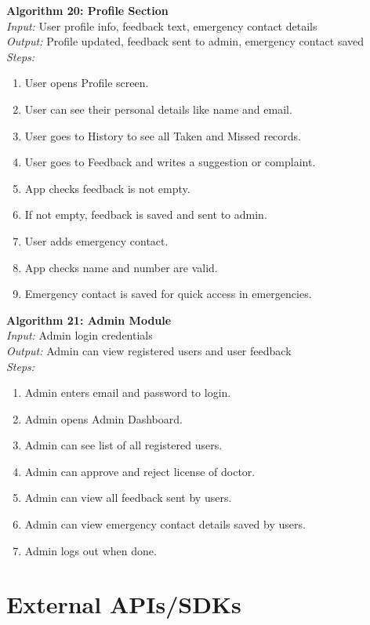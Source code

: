 \documentclass[12pt, a4paper, oneside]{report}
\begin{document}
\textbf{Algorithm 20: Profile Section}\\
\textit{Input:} User profile info, feedback text, emergency contact details\\
\textit{Output:} Profile updated, feedback sent to admin, emergency contact saved\\
\textit{Steps:}
\begin{enumerate}
    \item User opens Profile screen.
    \item User can see their personal details like name and email.
    \item User goes to History to see all Taken and Missed records.
    \item User goes to Feedback and writes a suggestion or complaint.
    \item App checks feedback is not empty.
    \item If not empty, feedback is saved and sent to admin.
    \item User adds emergency contact.
    \item App checks name and number are valid.
    \item Emergency contact is saved for quick access in emergencies.
\end{enumerate}

\textbf{Algorithm 21: Admin Module}\\
\textit{Input:} Admin login credentials\\
\textit{Output:} Admin can view registered users and user feedback\\
\textit{Steps:}
\begin{enumerate}
    \item Admin enters email and password to login.
    \item Admin opens Admin Dashboard.
    \item Admin can see list of all registered users.
    \item Admin can approve and reject license of doctor.
    \item Admin can view all feedback sent by users.
    \item Admin can view emergency contact details saved by users.
    \item Admin logs out when done.
\end{enumerate}


\section{External APIs/SDKs}
\end{document}

